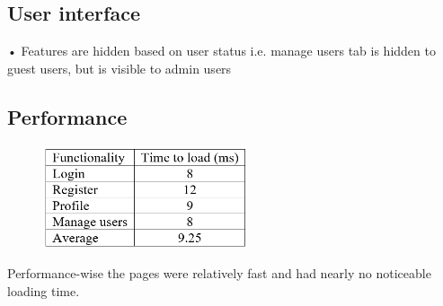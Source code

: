 \documentclass[english]{article}
\begin{document}
\subsection{User interface}
•	Features are hidden based on user status i.e. manage users tab is hidden to guest users, but is visible to admin users\\

\subsection{Performance}
\begin{figure}[ht!]
\includegraphics[width=60mm]{15.png}
\end{figure}
Performance-wise the pages were relatively fast and had nearly no noticeable loading time.
\end{document}
